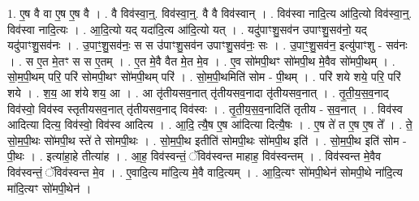 \documentclass[17pt]{extarticle}
\begin{document}
1. ए॒ष वै वा ए॒ष ए॒ष वै । . वै विव॑स्वा॒न्॒. विव॑स्वा॒न्॒. वै वै विव॑स्वान् । . विव॑स्वा नादि॒त्य आ॑दि॒त्यो विव॑स्वा॒न्॒. विव॑स्वा नादि॒त्यः । . आ॒दि॒त्यो यद् यदा॑दि॒त्य आ॑दि॒त्यो यत् । . यदु॑पाꣳशु॒सव॑न उपाꣳशु॒सव॑नो॒ यद् यदु॑पाꣳशु॒सव॑नः । . उ॒पाꣳ॒॒शु॒सव॑नः॒ स स उ॑पाꣳशु॒सव॑न उपाꣳशु॒सव॑नः॒ सः । . उ॒पाꣳ॒॒शु॒सव॑न॒ इत्यु॑पाꣳशु - सव॑नः । . स ए॒त मे॒तꣳ स स ए॒तम् । . ए॒त मे॒वै वैत मे॒त मे॒व । . ए॒व सो॑मपी॒थꣳ सो॑मपी॒थ मे॒वैव सो॑मपी॒थम् । . सो॒म॒पी॒थम् परि॒ परि॑ सोमपी॒थꣳ सो॑मपी॒थम् परि॑ । . सो॒म॒पी॒थमिति॑ सोम - पी॒थम् । . परि॑ शये शये॒ परि॒ परि॑ शये । . श॒य॒ आ श॑ये शय॒ आ । . आ तृ॑तीयसव॒नात् तृ॑तीयसव॒नादा तृ॑तीयसव॒नात् । . तृ॒ती॒य॒स॒व॒नाद् विव॑स्वो॒ विव॑स्व स्तृतीयसव॒नात् तृ॑तीयसव॒नाद् विव॑स्वः । . तृ॒ती॒य॒स॒व॒नादिति॑ तृतीय - स॒व॒नात् । . विव॑स्व आदित्या दित्य॒ विव॑स्वो॒ विव॑स्व आदित्य । . आ॒दि॒ त्यै॒ष ए॒ष आ॑दित्या दित्यै॒षः । . ए॒ष ते॑ त ए॒ष ए॒ष ते᳚ । . ते॒ सो॒म॒पी॒थः सो॑मपी॒थ स्ते॑ ते सोमपी॒थः । . सो॒म॒पी॒थ इतीति॑ सोमपी॒थः सो॑मपी॒थ इति॑ । . सो॒म॒पी॒थ इति॑ सोम - पी॒थः । . इत्या॑हा॒हे तीत्या॑ह । . आ॒ह॒ विव॑स्वन्तं॒ ॅविव॑स्वन्त माहाह॒ विव॑स्वन्तम् । . विव॑स्वन्त मे॒वैव विव॑स्वन्तं॒ ॅविव॑स्वन्त मे॒व । . ए॒वादि॒त्य मा॑दि॒त्य मे॒वै वादि॒त्यम् । . आ॒दि॒त्यꣳ सो॑मपी॒थेन॑ सोमपी॒थे ना॑दि॒त्य मा॑दि॒त्यꣳ सो॑मपी॒थेन॑ । \newline
\end{document}
